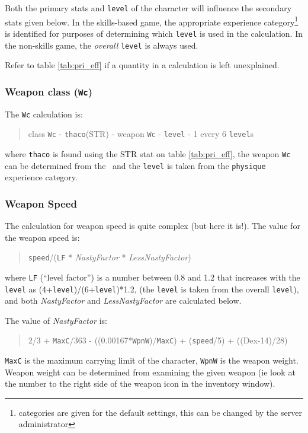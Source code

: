 Both the primary stats and {\tt level} of the character will influence
the secondary stats given below. In the skills-based game, the
appropriate experience category\footnote{categories
are given for the default settings, this can be changed by the
server administrator} is identified for purposes of determining
which {\tt level} is used in the calculation. In the non-skills
game, the {\em overall} {\tt level} is always used.

Refer to table \ref{tab:pri_eff} if a quantity in a calculation is
left unexplained.

\subsubsection{Weapon class ({\tt Wc})}
The {\tt Wc} calculation is:
\begin{quote}
class {\tt Wc} - {\tt thaco}(STR) - weapon {\tt Wc} - {\tt level} - 1 every 6 {\tt level}s
\end{quote}
where {\tt thaco} is found using the STR stat on table \ref{tab:pri_eff},
the weapon {\tt Wc}
can be determined from the \spoiler\ and the {\tt level} is taken from the
{\tt physique} experience category.

\subsubsection{Weapon Speed}
The calculation for weapon speed is quite complex (but here it is!).
The value for the weapon speed is:
\begin{quote}
{\tt speed}/({\tt LF} * {\sl NastyFactor} * {\sl LessNastyFactor})
\end{quote}
where {\tt LF} (``level factor'') is a number between 0.8 and 1.2 that
increases with the {\tt level} as (4+{\tt level})/(6+{\tt level})*1.2,
(the {\tt level} is taken from the overall {\tt level}),
and both {\sl NastyFactor} and {\sl LessNastyFactor} are calculated below.

The value of {\sl NastyFactor} is:
{\small
\begin{quote}
2/3 + {\tt MaxC}/363 - ((0.00167*{\tt WpnW})/{\tt MaxC}) + ({\tt speed}/5) + ((Dex-14)/28)
\end{quote}
}
 {\tt MaxC} is the maximum carrying
limit of the character, {\tt WpnW} is
the weapon weight. Weapon weight can be determined from examining the given
weapon (ie look at the number to the right side of the weapon icon in the
inventory window).


